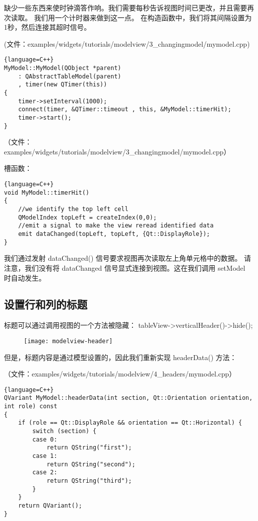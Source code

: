 缺少一些东西来使时钟滴答作响。我们需要每秒告诉视图时间已更改，并且需要再次读取。
我们用一个计时器来做到这一点。
在构造函数中，我们将其间隔设置为1秒，然后连接其超时信号。

(文件：examples/widgets/tutorials/modelview/3\_changingmodel/mymodel.cpp)

\begin{lstlisting}{language=C++}
MyModel::MyModel(QObject *parent)
    : QAbstractTableModel(parent)
    , timer(new QTimer(this))
{
    timer->setInterval(1000);
    connect(timer, &QTimer::timeout , this, &MyModel::timerHit);
    timer->start();
}
\end{lstlisting}

（文件：examples/widgets/tutorials/modelview/3\_changingmodel/mymodel.cpp）

槽函数：

\begin{lstlisting}{language=C++}
void MyModel::timerHit()
{
    //we identify the top left cell
    QModelIndex topLeft = createIndex(0,0);
    //emit a signal to make the view reread identified data
    emit dataChanged(topLeft, topLeft, {Qt::DisplayRole});
}
\end{lstlisting}

我们通过发射 dataChanged() 信号要求视图再次读取左上角单元格中的数据。
请注意，我们没有将 dataChanged 信号显式连接到视图。这在我们调用 setModel 时自动发生。

\subsection{设置行和列的标题} 

标题可以通过调用视图的一个方法被隐藏： tableView->verticalHeader()->hide();

\begin{figure}[hbt!]  
\texttt{[image: modelview-header]}
\end{figure}

但是，标题内容是通过模型设置的，因此我们重新实现 headerData() 方法：

（文件：examples/widgets/tutorials/modelview/4\_headers/mymodel.cpp）

\begin{lstlisting}{language=C++}
QVariant MyModel::headerData(int section, Qt::Orientation orientation, int role) const
{
    if (role == Qt::DisplayRole && orientation == Qt::Horizontal) {
        switch (section) {
        case 0:
            return QString("first");
        case 1:
            return QString("second");
        case 2:
            return QString("third");
        }
    }
    return QVariant();
}
\end{lstlisting}

